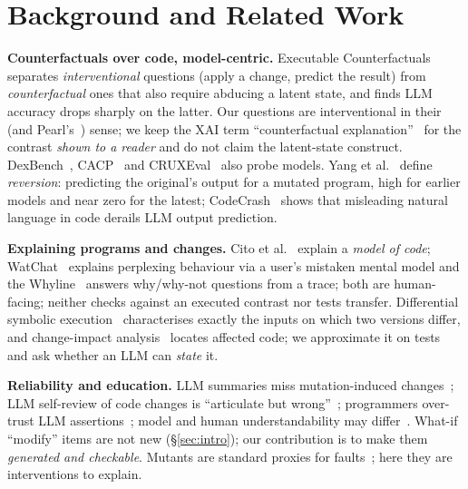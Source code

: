 \section{Background and Related Work}\label{sec:related}
\textbf{Counterfactuals over code, model-centric.}
Executable Counterfactuals~\cite{vashishtha2026executable} separates \emph{interventional} questions (apply a change,
predict the result) from \emph{counterfactual} ones that also require abducing a latent state, and finds LLM accuracy
drops sharply on the latter. Our questions are interventional in their (and Pearl's~\cite{pearl2009causality})
sense; we keep the XAI term ``counterfactual explanation''~\cite{wachter2018counterfactual,miller2019explanation} for the
contrast \emph{shown to a reader} and do not claim the latent-state construct. DexBench~\cite{hasanov2026path},
CACP~\cite{hooda2024cacp} and CRUXEval~\cite{gu2024cruxeval} also probe models. Yang et al.~\cite{yang2025reversion} define \emph{reversion}: predicting the original's output for a
mutated program, high for earlier models and near zero for the latest; CodeCrash~\cite{lam2025codecrash} shows that
misleading natural language in code derails LLM output prediction.

\textbf{Explaining programs and changes.} Cito et al.~\cite{cito2022counterfactual} explain a \emph{model of code};
WatChat~\cite{chandra2024watchat} explains perplexing behaviour via a user's mistaken mental model and the
Whyline~\cite{ko2008whyline} answers why/why-not questions from a trace; both are human-facing; neither checks against
an executed contrast nor tests transfer. Differential symbolic execution~\cite{person2008dse}
characterises exactly the inputs on which two versions differ, and change-impact
analysis~\cite{ren2004chianti} locates affected code; we approximate it on tests and ask whether an LLM can
\emph{state} it.

\textbf{Reliability and education.} LLM summaries miss mutation-induced changes~\cite{khatib2026mutation}; LLM self-review of
code changes is ``articulate but wrong''~\cite{reddy2026articulate}; programmers over-trust LLM assertions~\cite{kaufman2026judges};
model and human understandability may differ~\cite{rong2026behavioral}. What-if ``modify'' items are not new (\S\ref{sec:intro}); our contribution is to make
them \emph{generated and checkable}. Mutants are standard proxies for faults~\cite{jia2011mutation,just2014mutants}; here they are interventions to
explain.
